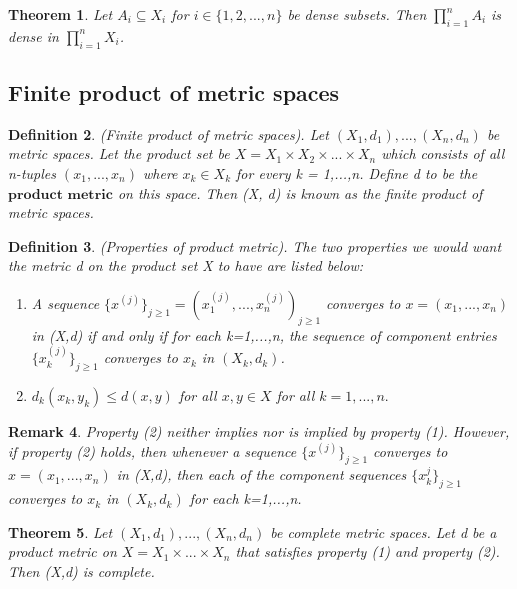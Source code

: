 \documentclass[twoside]{article}
\newcounter{lecnum}
\newtheorem{theorem}{Theorem}[lecnum]
\newtheorem{definition}[theorem]{Definition}
\newtheorem{remark}[theorem]{Remark}
\begin{document}
\begin{theorem}Let $A_i \subseteq X_i$ for $i \in \{1,2,...,n\}$ be dense subsets. Then $\prod_{i=1}^nA_i$ is dense in $\prod_{i=1}^nX_i$.
\end{theorem}

\subsection{Finite product of metric spaces}

\begin{definition}(Finite product of metric spaces). Let $(X_1,d_1),...,(X_n,d_n)$ be metric spaces. Let the product set be $X = X_1 \times X_2 \times ... \times X_n$ which consists of all n-tuples $(x_1,...,x_n)$ where $x_k \in X_k$ for every k = 1,...,n. Define d to be the $\textbf{product metric}$ on this space. Then (X, d) is known as the finite product of metric spaces.
\end{definition}

\begin{definition}(Properties of product metric). The two properties we would want the metric d on the product set X to have are listed below:
\begin{enumerate}
\item A sequence $\{x^{(j)}\}_{j \geq 1} = (x_{1}^{(j)},...,x_{n}^{(j)})_{j \geq 1}$ converges to $x = (x_1,...,x_n)$ in (X,d) if and only if for each k=1,...,n, the sequence of component entries $\{x_{k}^{(j)}\}_{j \geq 1}$ converges to $x_k$ in $(X_k,d_k)$.
\item $d_k(x_k,y_k) \leq d(x,y)$ for all $x,y \in X$ for all $k=1,...,n.$
\end{enumerate}
\end{definition}

\begin{remark}Property (2) neither implies nor is implied by property (1). However, if property (2) holds, then whenever a sequence $\{x^{(j)}\}_{j \geq 1}$ converges to $x = (x_1,...,x_n)$ in (X,d), then each of the component sequences $\{x_{k}^{j}\}_{j \geq 1}$ converges to $x_k$ in $(X_k,d_k)$ for each k=1,...,n.
\end{remark}

\begin{theorem}Let $(X_1,d_1),...,(X_n,d_n)$ be complete metric spaces. Let d be a product metric on $X = X_1 \times ... \times X_n$ that satisfies property (1) and property (2). Then (X,d) is complete.
\end{theorem}
\end{document}
